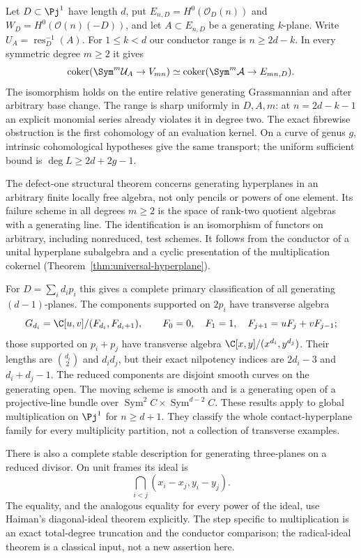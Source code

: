 Let $D\subset\Pj^1$ have length $d$, put
$E_{n,D}=H^0(\mathcal O_D(n))$ and $W_D=H^0(\mathcal O(n)(-D))$,
and let $A\subset E_{n,D}$ be a generating $k$-plane. Write
$U_A=\operatorname{res}_D^{-1}(A)$. For $1\le k<d$ our conductor
range is $n\ge2d-k$. In every symmetric degree $m\ge2$ it gives
\begin{equation}\label{eq:intro-conductor-cokernel}
 \operatorname{coker}(\Sym^m\mathcal U_A\to V_{mn})
 \simeq\operatorname{coker}(\Sym^m\mathcal A\to E_{mn,D}).
\end{equation}
The isomorphism holds on the entire relative generating Grassmannian
and after arbitrary base change. The range is sharp uniformly in
$D,A,m$: at $n=2d-k-1$ an explicit monomial series already violates
it in degree two. The exact fibrewise obstruction is the first
cohomology of an evaluation kernel. On a curve of genus $g$, intrinsic
cohomological hypotheses give the same transport; the uniform
sufficient bound is $\deg L\ge2d+2g-1$.

The defect-one structural theorem concerns generating hyperplanes in
an arbitrary finite locally free algebra, not only pencils or powers
of one element. Its failure scheme in all degrees $m\ge2$ is the
space of rank-two quotient algebras with a generating line. The
identification is an isomorphism of functors on arbitrary, including
nonreduced, test schemes. It follows from the conductor of a unital
hyperplane subalgebra and a cyclic presentation of the multiplication
cokernel (Theorem~\ref{thm:universal-hyperplane}).

For $D=\sum_i d_i p_i$ this gives a complete primary classification
of all generating $(d-1)$-planes. The components supported on $2p_i$
have transverse algebra
\[
 G_{d_i}=\C[u,v]/(F_{d_i},F_{d_i+1}),\qquad
 F_0=0,\quad F_1=1,\quad F_{j+1}=uF_j+vF_{j-1};
\]
those supported on $p_i+p_j$ have transverse algebra
$\C[x,y]/(x^{d_i},y^{d_j})$. Their lengths are $\binom{d_i}2$
and $d_id_j$, but their exact nilpotency indices are $2d_i-3$ and
$d_i+d_j-1$. The reduced components are disjoint smooth curves on
the generating open. The moving scheme is smooth and is a generating
open of a projective-line bundle over
$\operatorname{Sym}^2 C\times\operatorname{Sym}^{d-2} C$.
These results apply to global multiplication on $\Pj^1$ for $n\ge d+1$.
They classify the whole contact-hyperplane family for every
multiplicity partition, not a collection of transverse examples.

There is also a complete stable description for generating
three-planes on a reduced divisor. On unit frames its ideal is
\[
 \bigcap_{i<j}(x_i-x_j,y_i-y_j).
\]
The equality, and the analogous equality for every power of the
ideal, use Haiman's diagonal-ideal theorem explicitly. The step
specific to multiplication is an exact total-degree truncation and
the conductor comparison; the radical-ideal theorem is a classical
input, not a new assertion here.

